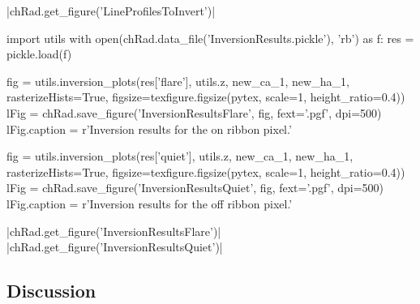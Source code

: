 \py[Radynversion]|chRad.get_figure('LineProfilesToInvert')|

\begin{pycode}[Radynversion]
import utils
with open(chRad.data_file('InversionResults.pickle'), 'rb') as f:
    res = pickle.load(f)

fig = utils.inversion_plots(res['flare'], utils.z, new_ca_1, new_ha_1, rasterizeHists=True, figsize=texfigure.figsize(pytex, scale=1, height_ratio=0.4))
lFig = chRad.save_figure('InversionResultsFlare', fig, fext='.pgf', dpi=500)
lFig.caption = r'Inversion results for the on ribbon pixel.'

fig = utils.inversion_plots(res['quiet'], utils.z, new_ca_1, new_ha_1, rasterizeHists=True, figsize=texfigure.figsize(pytex, scale=1, height_ratio=0.4))
lFig = chRad.save_figure('InversionResultsQuiet', fig, fext='.pgf', dpi=500)
lFig.caption = r'Inversion results for the off ribbon pixel.'
\end{pycode}

\py[Radynversion]|chRad.get_figure('InversionResultsFlare')|
\py[Radynversion]|chRad.get_figure('InversionResultsQuiet')|


\subsection{Discussion}